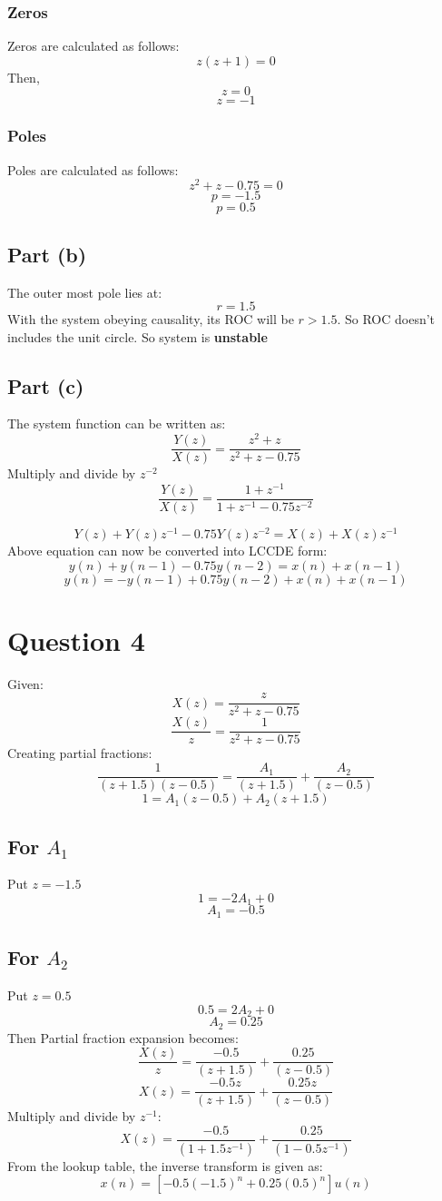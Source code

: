 \documentclass[12pt,letterpaper]{article}
\begin{document}
\subsubsection*{Zeros}
Zeros are calculated as follows: 
\[
    z(z+1) = 0
\]
Then, 
\[
\boxed{
z = 0
}
\]
\[
    \boxed{
    z = -1
    }
\]
\subsubsection*{Poles}

Poles are calculated as follows: 
\[
    z^2+z-0.75 = 0 
\]
\[
\boxed{
p = -1.5
}
\]
\[
\boxed{
p = 0.5
}
\]

\subsection*{Part (b)}
The outer most pole lies at: 
\[
    r = 1.5
\]
With the system obeying causality, its ROC will be $r>1.5$. So ROC doesn't includes the unit circle. So system is \textbf{unstable}

\subsection*{Part (c)}
The system function can be written as: 
\[
    \dfrac{Y(z)}{X(z)} = \dfrac{z^2+z}{z^2+z-0.75}
\]
Multiply and divide by $z^{-2}$
\[
    \dfrac{Y(z)}{X(z)} = \dfrac{1+z^{-1}}{1+z^{-1} - 0.75z^{-2}}
\]

\[
 Y(z) + Y(z)z^{-1} -0.75Y(z)z^{-2} = X(z) + X(z)z^{-1}    
\]
Above equation can now be converted into LCCDE form: 
\[
    y(n) + y(n-1) -0.75y(n-2) = x(n) + x(n-1) 
\]
\[
\boxed{
    y(n) = -y(n-1) +0.75y(n-2) + x(n) + x(n-1) 
}
\]
\pagebreak
\section*{Question 4}
Given: 
\[
    X(z) = \dfrac{z}{z^2+z-0.75}
\]
\[
    \dfrac{X(z)}{z} = \dfrac{1}{z^2+z-0.75}
\]
Creating partial fractions: 
\[
  \dfrac{1}{(z+1.5)(z-0.5)} = \dfrac{A_1}{(z+1.5)}  +\dfrac{A_2}{(z-0.5)}
\]
\[
 1 = A_1(z-0.5)+A_2(z+1.5)
\]
\subsection*{For $A_1$}
Put $z=-1.5$
\[
     1 = -2A_1  +0
\]
\[
\boxed{
A_1 = -0.5
}
\]
\subsection*{For $A_2$}
Put $z=0.5$
\[
     0.5 = 2A_2  +0
\]
\[
\boxed{
A_2 = 0.25
}
\]
Then Partial fraction expansion becomes: 
\[
\boxed{
  \dfrac{X(z)}{z} = \dfrac{-0.5}{(z+1.5)}  +\dfrac{0.25}{(z-0.5)}
}
\]
\[
    X(z) = \dfrac{-0.5z}{(z+1.5)}  +\dfrac{0.25z}{(z-0.5)}
\]
Multiply and divide by $z^{-1}$:
\[
    X(z) =  \dfrac{-0.5}{(1+1.5z^{-1})}  +\dfrac{0.25}{(1-0.5z^{-1})}
\]
From the lookup table, the inverse transform is given as: 
\[
\boxed{
    x(n) = [-0.5(-1.5)^n + 0.25( 0.5)^n] u(n)
}
\]
\pagebreak
\end{document}
